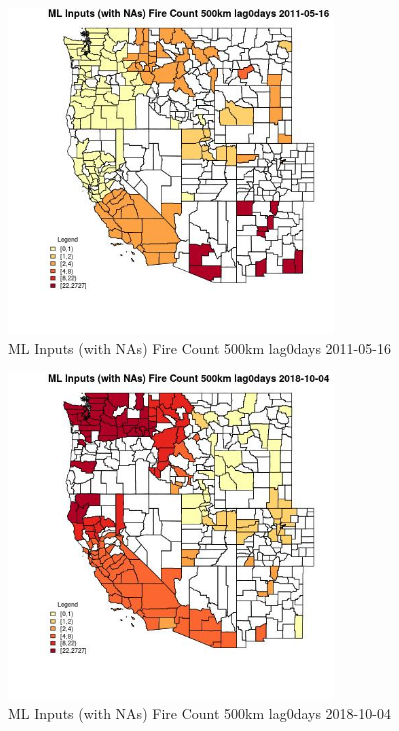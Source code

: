 \begin{figure} 
\centering  
\includegraphics[width=0.77\textwidth]{Code_Outputs/Report_ML_input_PM25_Step4_part_f_de_duplicated_aveswNAs_CountyFire_Count_500km_lag0daysMean2011-05-16.jpg} 
\caption{\label{fig:Report_ML_input_PM25_Step4_part_f_de_duplicated_aveswNAsCountyFire_Count_500km_lag0daysMean2011-05-16}ML Inputs (with NAs) Fire Count 500km lag0days 2011-05-16} 
\end{figure} 
 

\begin{figure} 
\centering  
\includegraphics[width=0.77\textwidth]{Code_Outputs/Report_ML_input_PM25_Step4_part_f_de_duplicated_aveswNAs_CountyFire_Count_500km_lag0daysMean2018-10-04.jpg} 
\caption{\label{fig:Report_ML_input_PM25_Step4_part_f_de_duplicated_aveswNAsCountyFire_Count_500km_lag0daysMean2018-10-04}ML Inputs (with NAs) Fire Count 500km lag0days 2018-10-04} 
\end{figure} 
 

